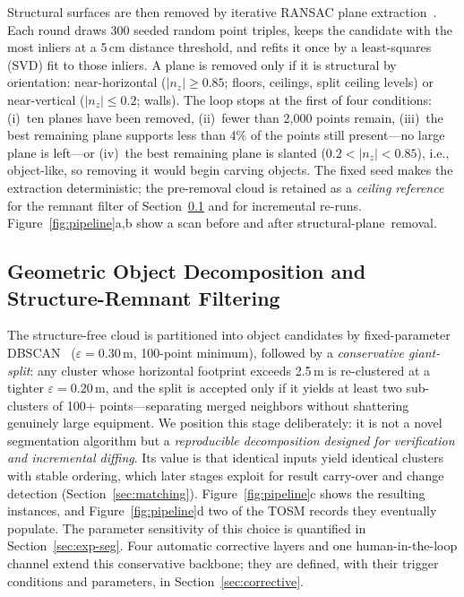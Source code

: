 \documentclass[electronics,article,accept,pdftex,moreauthors]{Definitions/mdpi}
\begin{document}
Structural surfaces are then removed by iterative RANSAC plane
extraction~\cite{fischler1981ransac}. Each round draws 300 seeded random
point triples, keeps the candidate with the most inliers at a 5\,cm distance
threshold, and refits it once by a least-squares (SVD) fit to those inliers.
A plane is removed only if it is structural by orientation: near-horizontal
($|n_z|\ge0.85$; floors, ceilings, split ceiling levels) or near-vertical
($|n_z|\le0.2$; walls). The loop stops at the first of four conditions:
(i)~ten planes have been removed, (ii)~fewer than 2{,}000 points remain,
(iii)~the best remaining plane supports less than 4\% of the points still
present---no large plane is left---or (iv)~the best remaining plane is
slanted ($0.2<|n_z|<0.85$), i.e., object-like, so removing it would begin
carving objects. The fixed seed makes the extraction deterministic; the
pre-removal cloud is retained as a \emph{ceiling reference}
for the remnant filter of Section~\ref{sec:decomposition} and for incremental
re-runs. Figure~\ref{fig:pipeline}a,b show a scan before and after
structural-\mbox{plane removal}.

\subsection{Geometric Object Decomposition and Structure-Remnant Filtering}
\label{sec:decomposition}

The structure-free cloud is partitioned into object candidates by
fixed-parameter DBSCAN~\cite{ester1996dbscan}
(\mbox{$\varepsilon=0.30$\,m}, 100-point minimum),
followed by a \emph{conservative giant-split}: any cluster whose horizontal
footprint exceeds 2.5\,m is re-clustered at a tighter
\mbox{$\varepsilon=0.20$\,m}, and the split is accepted only if it yields at
least two sub-clusters of 100+ points---separating merged neighbors without
shattering genuinely large equipment. We position this stage deliberately:
it is not a novel segmentation algorithm but a \emph{reproducible
decomposition designed for verification and incremental diffing}. Its value
is that identical inputs yield identical clusters with stable ordering, which
later stages exploit for result carry-over and change detection
(Section~\ref{sec:matching}). Figure~\ref{fig:pipeline}c shows the resulting
instances, and Figure~\ref{fig:pipeline}d two of the TOSM records they
eventually populate. The parameter sensitivity of this choice is
quantified in Section~\ref{sec:exp-seg}. Four automatic corrective layers and
one human-in-the-loop channel extend this conservative backbone; they are
defined, with their trigger conditions and parameters, in
Section~\ref{sec:corrective}.
\end{document}
